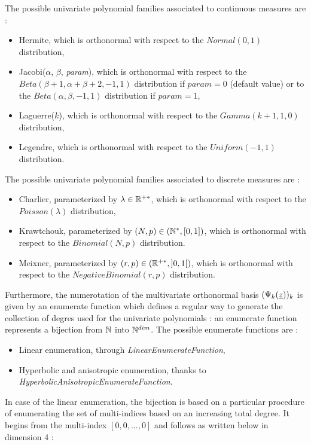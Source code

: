 The possible univariate polynomial families associated to continuous measures are :
\begin{itemize}
\item Hermite, which is orthonormal with respect to the  $Normal(0,1)$ distribution,
\item Jacobi($\alpha$, $\beta$, \textit{param}), which is orthonormal with respect to the $Beta(\beta + 1, \alpha + \beta + 2, -1, 1)$ distribution if $param = 0$ (default value) or to the $Beta(\alpha, \beta, -1, 1)$ distribution if $param = 1$,
\item Laguerre($k$), which is orthonormal with respect to the  $Gamma(k+1,1,0)$ distribution,
\item Legendre, which is orthonormal with respect to the  $Uniform(-1,1)$ distribution.
\end{itemize}

The possible univariate polynomial families associated to discrete measures are :
\begin{itemize}
\item Charlier, parameterized by $\lambda \in {\mathbb R}^{+*}$, which is orthonormal with respect to the  $Poisson(\lambda)$ distribution,
\item Krawtchouk, parameterized by $(N,p)\in ({\mathbb N}^*, [0,1])$, which is orthonormal with respect to the  $Binomial(N,p)$ distribution.
\item Meixner, parameterized by $(r,p)\in ({\mathbb R}^{+*}, ]0,1[)$, which is orthonormal with respect to the  $NegativeBinomial(r,p)$ distribution.
\end{itemize}


Furthermore, the numerotation of the multivariate orthonormal basis $(\Psi_k({\underline{z}}))_k$ is given by an enumerate function which defines a regular way to generate the collection of degres used for the univariate polynomials : an enumerate function represents a bijection from ${\mathbb N}$ into ${\mathbb N}^{dim}$.
The possible enumerate functions are :
\begin{itemize}
\item Linear enumeration, through \textit{LinearEnumerateFunction},
\item Hyperbolic and anisotropic enumeration, thanks to \textit{HyperbolicAnisotropicEnumerateFunction}.
\end{itemize}

In case of the linear enumeration, the bijection is based on a particular procedure of enumerating the set of multi-indices based on an increasing total degree. It begins from the multi-index $[0,0,...,0]$ and follows as written below in dimension 4 :

